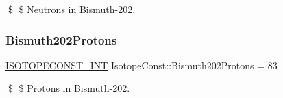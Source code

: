 \$ \$ Neutrons in Bismuth-\/202. \mbox{\label{group___isotope_const-_bismuth-_bi202_gad1fa578c352eecc64196492f2a3a8a4b}} 
\subsubsection{\texorpdfstring{Bismuth202\+Protons}{Bismuth202Protons}}
{\footnotesize\ttfamily \mbox{\hyperlink{group___isotope_const-_macros_ga5f18360b3e99483a35c32d789e62621c}{I\+S\+O\+T\+O\+P\+E\+C\+O\+N\+S\+T\+\_\+\+I\+NT}} Isotope\+Const\+::\+Bismuth202\+Protons = 83}

\$ \$ Protons in Bismuth-\/202. 